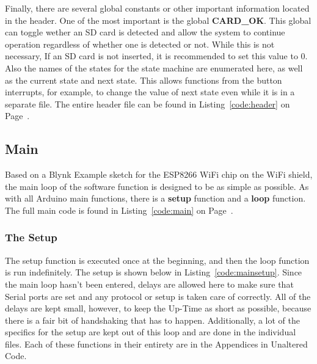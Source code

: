 \documentclass{article}
\begin{document}
Finally, there are several global constants or other important information located in the header. One of the most important is the global \textbf{CARD\_OK}. This global can toggle wether an SD card is detected and allow the system to continue operation regardless of whether one is detected or not. While this is not necessary, If an SD card is not inserted, it is recommended to set this value to 0. Also the names of the states for the state machine are enumerated here, as well as the current state and next state. This allows functions from the button interrupts, for example, to change the value of next state even while it is in a separate file. The entire header file can be found in Listing~\ref{code:header} on Page~\pageref{code:header}.

\subsection{Main}
Based on a Blynk Example sketch for the ESP8266 WiFi chip on the WiFi shield, the main loop of the software function is designed to be as simple as possible. As with all Arduino main functions, there is a \textbf{setup} function and a \textbf{loop} function. The full main code is found in Listing~\ref{code:main} on Page~\pageref{code:main}. 


\subsubsection{The Setup}

The setup function is executed once at the beginning, and then the loop function is run indefinitely. The setup is shown below in Listing~\ref{code:mainsetup}. Since the main loop hasn't been entered, delays are allowed here to make sure that Serial ports are set and any protocol or setup is taken care of correctly. All of the delays are kept small, however, to keep the Up-Time as short as possible, because there is a fair bit of handshaking that has to happen. Additionally, a lot of the specifics for the setup are kept out of this loop and are done in the individual files. Each of these functions in their entirety are in the Appendices in Unaltered Code. 
\end{document}

